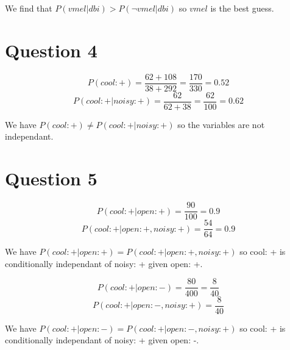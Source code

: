 \documentclass[10pt]{article}
\begin{document}
We find that $P(vmel|dbi) > P(\neg vmel|dbi)$ so $vmel$ is the
best guess.

\section*{Question 4}
\begin{equation}
    P(cool: +) = \frac{62 + 108}{38 + 292} = \frac{170}{330} = 0.52
\end{equation}
\begin{equation}
    P(cool: +|noisy: +) = \frac{62}{62 + 38} = \frac{62}{100} = 0.62
\end{equation}

We have $P(cool: +) \neq P(cool: +|noisy: +)$ so the variables are not independant.

\section*{Question 5}
\begin{equation}
    P(cool: +| open: +) = \frac{90}{100} = 0.9
\end{equation}
\begin{equation}
    P(cool: +| open: +, noisy: +) = \frac{54}{64} = 0.9
\end{equation}

We have $P(cool: +| open: +) = P(cool: +| open: +, noisy: +)$ so
cool: + is conditionally independant of noisy: + given open: +.


\begin{equation}
    P(cool: +| open: -) = \frac{80}{400} = \frac{8}{40}
\end{equation}
\begin{equation}
    P(cool: +| open: -, noisy: +) = \frac{8}{40}
\end{equation}

We have $P(cool: +| open: -) = P(cool: +| open: -, noisy: +)$ so
cool: + is conditionally independant of noisy: + given open: -.
\end{document}
